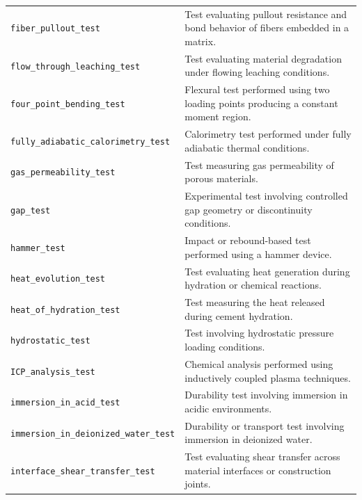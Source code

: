 \documentclass[11pt]{book}
\begin{document}
{\begin{longtable}{p{}p{}}
\texttt{fiber\_pullout\_test} &
Test evaluating pullout resistance and bond behavior of fibers embedded in a matrix. \\

\texttt{flow\_through\_leaching\_test} &
Test evaluating material degradation under flowing leaching conditions. \\

\texttt{four\_point\_bending\_test} &
Flexural test performed using two loading points producing a constant moment region. \\

\texttt{fully\_adiabatic\_calorimetry\_test} &
Calorimetry test performed under fully adiabatic thermal conditions. \\

\texttt{gas\_permeability\_test} &
Test measuring gas permeability of porous materials. \\

\texttt{gap\_test} &
Experimental test involving controlled gap geometry or discontinuity conditions. \\

\texttt{hammer\_test} &
Impact or rebound-based test performed using a hammer device. \\

\texttt{heat\_evolution\_test} &
Test evaluating heat generation during hydration or chemical reactions. \\

\texttt{heat\_of\_hydration\_test} &
Test measuring the heat released during cement hydration. \\

\texttt{hydrostatic\_test} &
Test involving hydrostatic pressure loading conditions. \\

\texttt{ICP\_analysis\_test} &
Chemical analysis performed using inductively coupled plasma techniques. \\

\texttt{immersion\_in\_acid\_test} &
Durability test involving immersion in acidic environments. \\

\texttt{immersion\_in\_deionized\_water\_test} &
Durability or transport test involving immersion in deionized water. \\

\texttt{interface\_shear\_transfer\_test} &
Test evaluating shear transfer across material interfaces or construction joints. \\


\end{longtable}}
\end{document}
